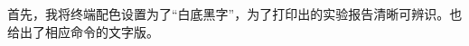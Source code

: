 \documentclass[cs4size,a4paper,nofonts]{ctexart}
\begin{document}
\newcommand{\image}[3][height=10cm]{%
    \centering
    \texttt{[image: images/\#2.png]}
    \caption{#3}
    \label{fig:#3}
}

\newcommand{\subimage}[4][height=10cm]{
    \centering
    \subfigure[]{
        \texttt{[image: images/\#2.png]}
        \label{fig:#3:#4}
    }
}

\newcommand{\images}[3][width=\textwidth]{\begin{minipage}[t]{0.33\textwidth}
\centering
\texttt{[image: images/\#2.png]}
\caption{#3}
\label{fig:#3}
\end{minipage}}

首先，我将终端配色设置为了“白底黑字”，为了打印出的实验报告清晰可辨识。也给出了相应命令的文字版。
\end{document}
